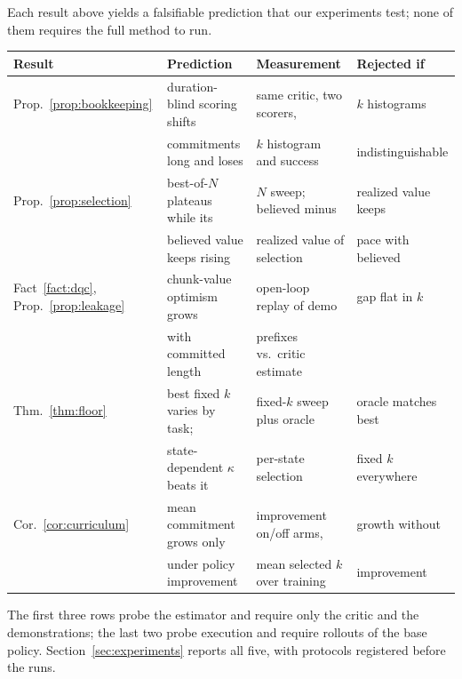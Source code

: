 Each result above yields a falsifiable prediction that our experiments test; none of them requires
the full method to run.

\begin{center}
\begin{tabular}{@{}llll@{}}
\toprule
Result & Prediction & Measurement & Rejected if \\
\midrule
Prop.~\ref{prop:bookkeeping} & duration-blind scoring shifts & same critic, two scorers, & $k$ histograms \\
 & commitments long and loses & $k$ histogram and success & indistinguishable \\
\addlinespace
Prop.~\ref{prop:selection} & best-of-$N$ plateaus while its & $N$ sweep; believed minus & realized value keeps \\
 & believed value keeps rising & realized value of selection & pace with believed \\
\addlinespace
Fact~\ref{fact:dqc}, Prop.~\ref{prop:leakage} & chunk-value optimism grows & open-loop replay of demo & gap flat in $k$ \\
 & with committed length & prefixes vs.\ critic estimate & \\
\addlinespace
Thm.~\ref{thm:floor} & best fixed $k$ varies by task; & fixed-$k$ sweep plus oracle & oracle matches best \\
 & state-dependent $\kappa$ beats it & per-state selection & fixed $k$ everywhere \\
\addlinespace
Cor.~\ref{cor:curriculum} & mean commitment grows only & improvement on/off arms, & growth without \\
 & under policy improvement & mean selected $k$ over training & improvement \\
\bottomrule
\end{tabular}
\end{center}

The first three rows probe the estimator and require only the critic and the demonstrations; the
last two probe execution and require rollouts of the base policy. Section~\ref{sec:experiments}
reports all five, with protocols registered before the runs.
